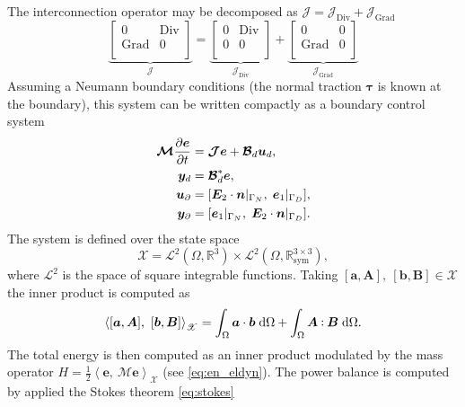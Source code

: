 \documentclass{svjour3}                     %
\DeclareMathOperator*{\Grad}{Grad}
\DeclareMathOperator*{\Div}{Div}
\def\onedot{$\mathsurround0pt\ldotp$}
\def\cddot{%
	\mathbin{\vcenter{\baselineskip.67ex
			\hbox{\onedot}\hbox{\onedot}}%
}}
\begin{document}
The interconnection operator may be decomposed as $\bm{\mathcal{J}} = \bm{\mathcal{J}}_{\Div} + \bm{\mathcal{J}}_{\Grad}$
\begin{equation}
\underbrace{\begin{bmatrix}
	0 & \Div \\ \Grad & 0 \\
	\end{bmatrix}}_{\bm{\mathcal{J}}} = 
\underbrace{\begin{bmatrix}
	0 & \Div \\ 0  & 0 \\
	\end{bmatrix}}_{\bm{\mathcal{J}}_{\Div}} + 
\underbrace{\begin{bmatrix}
	0 & 0 \\ \Grad & 0 \\
	\end{bmatrix}}_{\bm{\mathcal{J}}_{\Grad}}
\end{equation}
Assuming a Neumann boundary conditions (the normal traction $\bm\tau$ is known at the boundary),
this system can be written compactly as a boundary control system
\begin{equation}
\label{eq:eldyn_PDE}
\begin{aligned}
\bm{\mathcal{M}} \diffp{\bm{e}}{t} &= \bm{\mathcal{J}} \bm{e} + \bm{\mathcal{B}}_d \bm{u}_d, \\
\bm{y}_d &= \bm{\mathcal{B}}_d^* \bm{e}, \\
\bm{u}_\partial &= [\bm{E}_2 \cdot \bm{n}|_{\Gamma_N}, \; \bm{e}_1|_{\Gamma_D}], \\
\bm{y}_\partial &= [\bm{e}_1|_{\Gamma_N}, \; \bm{E}_2 \cdot \bm{n}|_{\Gamma_D}].
\end{aligned}
\end{equation}
The system is defined over the state space
\[
\mathscr{X} = \mathscr{L}^2(\Omega, \mathbb{R}^3) \times\mathscr{L}^2(\Omega, \mathbb{R}^{3\times 3}_{\text{sym}}),
\]
where $\mathscr{L}^2$ is the space of square integrable functions. Taking  $[\bm{a}, \bm{A}], \ [\bm{b}, \bm{B}] \in \mathscr{X}$ the inner product is computed as
\[
\left\langle [\bm{a}, \bm{A}], \ [\bm{b}, \bm{B}] \right\rangle_{\mathscr{X}} = \int_{\Omega} \bm{a} \cdot \bm{b} \d{\Omega} + \int_{\Omega} \bm{A} \cddot \bm{B} \d{\Omega}.
\]
The total energy is then computed as an inner product modulated by the mass operator $H = \frac{1}{2} \left\langle \bm{e}, \ \bm{\mathcal{M}} \bm{e} \right\rangle_{\mathscr{X}}$ (see \eqref{eq:en_eldyn}). The power balance is computed by applied the Stokes theorem \eqref{eq:stokes}
\end{document}
